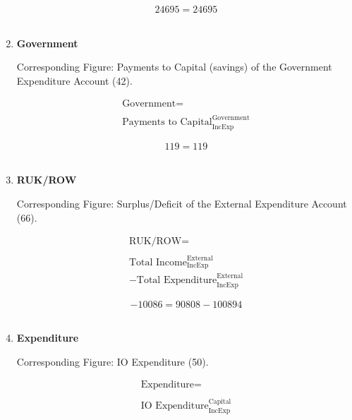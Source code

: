 \begin{enumerate}
\begin{equation} \nonumber
24695 = 24695
\end{equation}\\


\item \textbf {Government}

Corresponding Figure: Payments to Capital (savings) of the Government Expenditure Account (42).

\begin{equation}
\begin{split}
\text{Government} =  \\ \\
\text{Payments to Capital}^\text{Government}_\text{IncExp}
\end{split} \label{eq:2.5.51}
\end{equation}

\begin{equation} \nonumber
119 = 119
\end{equation}\\


\item \textbf {RUK/ROW}

Corresponding Figure: Surplus/Deficit of the External Expenditure Account (66).

\begin{equation}
\begin{split}
\text{RUK/ROW} =  \\ \\
\text{Total Income}^\text{External}_\text{IncExp}\\
-\text{Total Expenditure}^\text{External}_\text{IncExp}
\end{split} \label{eq:2.5.52}
\end{equation}

\begin{equation} \nonumber
-10086 = 90808-100894
\end{equation}\\


\pagebreak

\item \textbf {Expenditure}

Corresponding Figure: IO Expenditure (50).
    
\begin{equation}
\begin{split}
\text{Expenditure} =  \\ \\
\text{IO Expenditure}^\text{Capital}_\text{IncExp}
\end{split} \label{eq:2.5.53}
\end{equation}


\end{enumerate}

